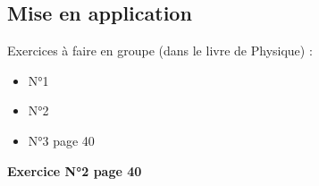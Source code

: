 \documentclass{article}
\begin{document}
\subsection{Mise en application}

\begin{tcolorbox}[colback=blue!10!white, colframe=blue!75!black, title=Application : Structure électronique]
  Exercices à faire en groupe (dans le livre de Physique) : 
  \begin{itemize}[noitemsep]
    \item N°1
    \item N°2
    \item N°3 page 40
  \end{itemize}
\end{tcolorbox}


\textbf{Exercice N°2 page 40}
\vspace{1em}
\end{document}
